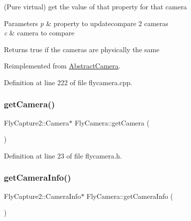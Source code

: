 (Pure virtual) get the value of that property for that camera 


\begin{DoxyParams}{Parameters}
{\em p} & property to updatecompare 2 cameras \\
\hline
{\em c} & camera to compare \\
\hline
\end{DoxyParams}
\begin{DoxyReturn}{Returns}
true if the cameras are physically the same 
\end{DoxyReturn}


Reimplemented from \mbox{\hyperlink{class_abstract_camera_a244917ab081c18caf389473847871dd6}{Abstract\+Camera}}.



Definition at line 222 of file flycamera.\+cpp.

\mbox{\label{class_fly_camera_acb0c1380011ed78ce6fcd5ccfd7073f0}} 
\subsubsection{\texorpdfstring{getCamera()}{getCamera()}}
{\footnotesize\ttfamily Fly\+Capture2\+::\+Camera$\ast$ Fly\+Camera\+::get\+Camera (\begin{DoxyParamCaption}{ }\end{DoxyParamCaption})\hspace{0.3cm}{\ttfamily [inline]}}



Definition at line 23 of file flycamera.\+h.

\mbox{\label{class_fly_camera_a999b2d2f7e13245e8f00a1f8df0f553a}} 
\subsubsection{\texorpdfstring{getCameraInfo()}{getCameraInfo()}}
{\footnotesize\ttfamily Fly\+Capture2\+::\+Camera\+Info$\ast$ Fly\+Camera\+::get\+Camera\+Info (\begin{DoxyParamCaption}{ }\end{DoxyParamCaption})\hspace{0.3cm}{\ttfamily [inline]}}



